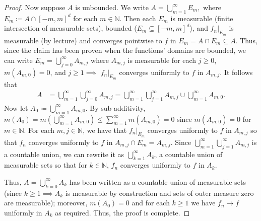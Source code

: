 \begin{proof}
Now suppose \( A \) is unbounded. We write \( A = \bigcup_{m=1}^{\infty} E_m,\) where \(E_m \coloneqq  A \cap [-m,m]^{d}  \) for each \( m \in \mathbb{N} \). Then each \( E_m \) is measurable (finite intersection of measurable sets), bounded (\( E_m\subseteq [-m,m]^{d}  \)), and \( f_n|_{E_m}  \) is measurable (by lecture) and converges pointwise to \( f \) in \( E_m = A \cap E_m \subseteq A\). Thus, since the claim has been proven when the functions' domains are bounded, we can write \( E_m = \bigcup_{j=0}^{\infty} A_{m, j}  \) where \( A_{m,j}  \) is measurable for each \( j \geq 0 \), \( m(A_{m,0} ) = 0 \), and \( j \geq 1 \implies  \) \( f_n|_{E_m} \) converges uniformly to \( f \) in \( A_{m,j}  \). It follows that
\begin{align*}
	A &= \bigcup_{m=1}^{\infty} \bigcup_{j=0}^{\infty} A_{m,j} = \bigcup_{m=1}^{\infty} \bigcup_{j=1}^{\infty} A_{m,j} \cup \bigcup_{m=1}^{\infty} A_{m,0}. 
\end{align*}
Now let \( A_0 \coloneqq \bigcup_{m=1}^{\infty} A_{m,0}  \). By sub-additivity, \( m(A_0) = m(\bigcup_{m=1}^{\infty} A_{m,0} ) \leq \sum_{m=1}^{\infty}m(A_{m,0} ) = 0\) since \( m(A_{m,0}) = 0  \) for \( m \in \mathbb{N}  \). For each \( m,j \in \mathbb{N}  \), we have that \( f_n |_{E_m} \) converges uniformly to \( f \) in \( A_{m,j}  \) so that \( f_n \) converges uniformly to \( f \) in \( A_{m,j} \cap E_m  = A_{m,j} \). Since \( \bigcup_{m=1}^{\infty} \bigcup_{j=1}^{\infty} A_{m,j}  \) is a countable union, we can rewrite it as \( \bigcup_{k=1}^{\infty} A_k \), a countable union of measurable sets so that for \( k \in \mathbb{N}  \), \( f_n \) converges uniformly to \( f \) in \( A_k \).

Thus, \( A = \bigcup_{k=0}^{\infty} A_k\) has been written as a countable union of measurable sets (since \( k \geq 1 \implies A_k \) is measurable by construction and sets of outer measure zero are measurable); moreover, \( m(A_0) = 0 \) and for each \( k \geq 1 \) we have \( f_n \to f \) uniformly in \( A_k \) as required. Thus, the proof is complete.
\end{proof}
%
